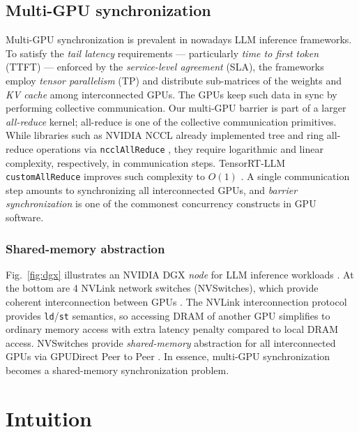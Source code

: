 \documentclass[acmsmall]{acmart}
\begin{document}
\subsection{Multi-GPU synchronization}

Multi-GPU synchronization is prevalent in nowadays LLM inference frameworks. To satisfy the \textit{tail latency} requirements --- particularly \textit{time to first token} (TTFT) --- enforced by the \textit{service-level agreement} (SLA), the frameworks employ \textit{tensor parallelism} (TP) and distribute sub-matrices of the weights and \textit{KV cache} among interconnected GPUs. The GPUs keep such data in sync by performing collective communication. Our multi-GPU barrier is part of a larger \textit{all-reduce} kernel; all-reduce is one of the collective communication primitives. While libraries such as NVIDIA NCCL already implemented tree and ring all-reduce operations via \texttt{ncclAllReduce} \cite{nccl}, they require logarithmic and linear complexity, respectively, in communication steps. TensorRT-LLM \texttt{customAllReduce} improves such complexity to $O(1)$ \cite{customallreduce}. A single communication step amounts to synchronizing all interconnected GPUs, and \textit{barrier synchronization} is one of the commonest concurrency constructs in GPU software.

\subsubsection{Shared-memory abstraction}

Fig.~\ref{fig:dgx} illustrates an NVIDIA DGX \textit{node} for LLM inference workloads \cite{dgx}. At the bottom are 4 NVLink network switches (NVSwitches), which provide coherent interconnection between GPUs \cite{nvswitch}. The NVLink interconnection protocol provides \verb|ld|/\verb|st| semantics, so accessing DRAM of another GPU simplifies to ordinary memory access with extra latency penalty compared to local DRAM access. NVSwitches provide \textit{shared-memory} abstraction for all interconnected GPUs via GPUDirect Peer to Peer \cite{gdp2p}. In essence, multi-GPU synchronization becomes a shared-memory synchronization problem.

\section{Intuition}
\label{sec:intuition}
\end{document}
